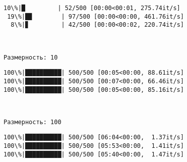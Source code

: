 \documentclass[11pt]{article}
\begin{document}
    \begin{Verbatim}[commandchars=\\\{\}]
 10\%|█         | 52/500 [00:00<00:01, 275.74it/s]
 19\%|█▉        | 97/500 [00:00<00:00, 461.76it/s]
  8\%|▊         | 42/500 [00:00<00:02, 220.74it/s]

    \end{Verbatim}

    \begin{center}
    \end{center}
    { \hspace*{\fill} \\}
    
    \begin{Verbatim}[commandchars=\\\{\}]
Размерность: 10

    \end{Verbatim}

    \begin{Verbatim}[commandchars=\\\{\}]
100\%|██████████| 500/500 [00:05<00:00, 88.61it/s]
100\%|██████████| 500/500 [00:07<00:00, 66.46it/s]
100\%|██████████| 500/500 [00:05<00:00, 85.16it/s]

    \end{Verbatim}

    \begin{center}
    \end{center}
    { \hspace*{\fill} \\}
    
    \begin{Verbatim}[commandchars=\\\{\}]
Размерность: 100

    \end{Verbatim}

    \begin{Verbatim}[commandchars=\\\{\}]
100\%|██████████| 500/500 [06:04<00:00,  1.37it/s]
100\%|██████████| 500/500 [05:53<00:00,  1.41it/s]
100\%|██████████| 500/500 [05:40<00:00,  1.47it/s]

    \end{Verbatim}

    \begin{center}
    \end{center}
    { \hspace*{\fill} \\}
    
\end{document}
